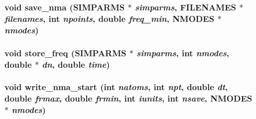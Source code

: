 \subsubsection{\setlength{\rightskip}{0pt plus 5cm}void save\_\-nma ({\bf SIMPARMS} $\ast$ {\em simparms}, {\bf FILENAMES} $\ast$ {\em filenames}, int {\em npoints}, double {\em freq\_\-min}, {\bf NMODES} $\ast$ {\em nmodes})}\label{md__nmaout_8c_07b4b3619b8dde69bf89cabcab0c086d}


\subsubsection{\setlength{\rightskip}{0pt plus 5cm}void store\_\-freq ({\bf SIMPARMS} $\ast$ {\em simparms}, int {\em nmodes}, double $\ast$ {\em dn}, double {\em time})}\label{md__nmaout_8c_dbcdcbdadea35d2e60b0719fcffeaba6}


\subsubsection{\setlength{\rightskip}{0pt plus 5cm}void write\_\-nma\_\-start (int {\em natoms}, int {\em npt}, double {\em dt}, double {\em frmax}, double {\em frmin}, int {\em iunits}, int {\em nsave}, {\bf NMODES} $\ast$ {\em nmodes})}\label{md__nmaout_8c_b291d317c07e1471b4359902f59f35eb}


